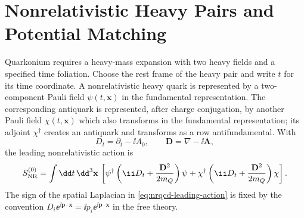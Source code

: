 \section{Nonrelativistic Heavy Pairs and Potential Matching}
\label{sec:qcd-nrqcd-potential-matching}

Quarkonium requires a heavy-mass expansion with two heavy fields and a
specified time foliation.  Choose the rest frame of the heavy pair and write
\(t\) for its time coordinate.  A nonrelativistic heavy quark is represented by
a two-component Pauli field \(\psi(t,\mathbf x)\) in the fundamental
representation.  The corresponding antiquark is represented, after charge
conjugation, by another Pauli field \(\chi(t,\mathbf x)\) which also
transforms in the fundamental representation; its adjoint \(\chi^\dagger\)
creates an antiquark and transforms as a row antifundamental.  With
\[
  D_t=\partial_t-\ii A_0,\qquad
  \mathbf D=\nabla-\ii\mathbf A ,
\]
the leading nonrelativistic action is
\begin{equation}
  S_{\rm NR}^{(0)}
  =
  \int \dd t\,\dd^3\mathbf x\,
  \left[
    \psi^\dagger\left(\ii D_t+\frac{\mathbf D^2}{2m_Q}\right)\psi
    +
    \chi^\dagger\left(\ii D_t+\frac{\mathbf D^2}{2m_Q}\right)\chi
  \right].
  \label{eq:nrqcd-leading-action}
\end{equation}
The sign of the spatial Laplacian in \eqref{eq:nrqcd-leading-action} is fixed
by the convention \(D_i\ee^{\ii\mathbf p\cdot\mathbf x}=\ii p_i
\ee^{\ii\mathbf p\cdot\mathbf x}\) in the free theory.

